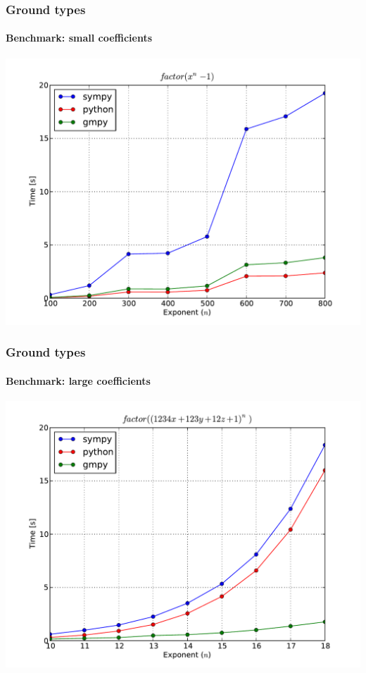 \documentclass{beamer}
\begin{document}
\begin{frame}
    \frametitle{Ground types}
    \framesubtitle{Benchmark: small coefficients}

    \begin{center}
        \includegraphics[scale=0.45]{images/ground-factor-small.pdf}
    \end{center}
\end{frame}

\begin{frame}
    \frametitle{Ground types}
    \framesubtitle{Benchmark: large coefficients}

    \begin{center}
        \includegraphics[scale=0.45]{images/ground-factor-large.pdf}
    \end{center}
\end{frame}
\end{document}
